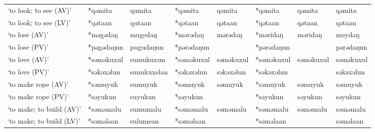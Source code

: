 \begin{landscape}
\begin{longtable}[c]{@{}p{3cm}<{\raggedright}p{2.75cm}<{\raggedright}p{2.75cm}<{\raggedright}p{2.75cm}<{\raggedright}p{2.75cm}<{\raggedright}p{2.75cm}<{\raggedright}p{2.75cm}<{\raggedright}p{2.75cm}<{\raggedright}@{}}
`to look; to see (AV)'                               & *qəmita      & qumita                        & *qəmita        & qəmita                     & *qəmita          & qəmita                   & qəmita                            \\
`to look; to see (LV)'                               & *qətaan      & qutaan                        & *qətaan        & qətaan                     & *qətaan          & qətaan                   & qətaan                            \\
`to lose (AV)'                                       & *məgədaŋ     & mugedaŋ                       & *mərədaŋ       & mərədaŋ                    & *məridaŋ         & məridaŋ                  & meydaŋ                            \\
`to lose (PV)'                                       & *pəgədaŋun   & pugudaŋun                     & *pərədaŋun     &                            & *pərədaŋun       &                          & pərədaŋun                         \\
`to love (AV)'                                       & *səməkuxul   & sumukuxun                     & *səməkuxul     & səməkuxul                  & *səməkuxul       & səməkuxul                & səməkuxul                         \\
`to love (PV)'                                       & *səkəxəlun   & sunukuxelan                   & *səkəxəlun     & səkəxəlun                  & *səkəxəlun       &                          & səkəxəlun                         \\
`to make rope (AV)'                                  & *səmuyuk     & sumuyuk                       & *səmuyuk       & səmuyuk                    & *səmuyuk         & səmuyuk                  & səmuyuk                           \\
`to make rope (PV)'                                  & *səyukun     & suyukun                       & *səyukun       &                            & *səyukun         & səyukun                  & səyukun                           \\
`to make; to build (AV)'                             & *səməmalu    & sumumalu                      & *səməmalu      & səməmalu                   & *səməmalu        & səməmalu                 & səməmalu                          \\
`to make; to build (LV)'                             & *səmələan    & sulumean                      & *səməlaan      &                            & *səməlaan        &                          & səməlaan                          \\

\end{longtable}
\end{landscape}
